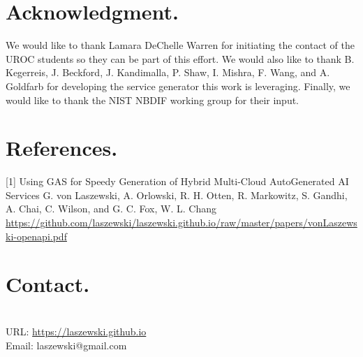 \documentclass[letter,10pt]{article}
\begin{document}
\begin{multicols}{3}
\section*{Acknowledgment.} We would like to thank Lamara DeChelle Warren for initiating the contact of the UROC students so they can be part of this effort. 
We would also like to thank
B. Kegerreis,
J. Beckford,
J. Kandimalla,
P. Shaw,
I. Mishra,
F. Wang, and A. Goldfarb for developing the service generator this work is leveraging. Finally, we would like to thank the NIST NBDIF working group for their input.

\section*{References.}

[1] Using GAS for Speedy Generation of Hybrid Multi-Cloud AutoGenerated AI Services
G. von Laszewski,
A. Orlowski,
R. H. Otten,
R. Markowitz,
S. Gandhi,
A. Chai,
C. Wilson, and
G. C. Fox,
W. L. Chang
\url{https://github.com/laszewski/laszewski.github.io/raw/master/papers/vonLaszewski-openapi.pdf}

%
%

\section*{Contact.} ~\\
URL: \url{https://laszewski.github.io}\\
Email: laszewski@gmail.com


\end{multicols}
\end{document}
